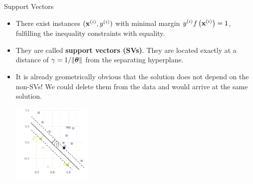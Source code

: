 \documentclass[11pt,compress,t,notes=noshow, xcolor=table]{beamer}
\begin{document}
\begin{vbframe}{Support Vectors}



  \begin{itemize}
    \item There exist instances $(\mathbf{x}^{(i)}, y^{(i)})$ with minimal margin
    $y^{(i)}  f\left(\mathbf{x}^{(i)}\right) = 1$, fulfilling the inequality constraints with equality.
    \item They are called
    \textbf{support vectors (SVs)}. They are located exactly at
    a distance of $\gamma = 1 / \|\bm{\theta}\|$ from the separating hyperplane.
    \item It is already geometrically obvious 
      that the solution does not depend on the non-SVs! We could delete them from the data and would arrive at the same solution.
    \vspace{0.5cm}
    

\begin{center}
\includegraphics[width=0.3\textwidth]{figure/support_vectors.png} \\
\end{center}


  \end{itemize}


\end{vbframe}
\end{document}
